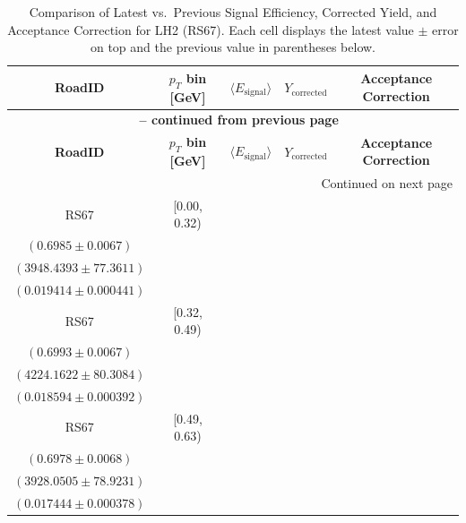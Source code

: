 {\footnotesize
\renewcommand{\arraystretch}{1.35}
\begin{longtable}{|c|c|c|c|c|}
\caption{Comparison of Latest vs.\ Previous Signal Efficiency, Corrected Yield, and Acceptance Correction for LH2 (RS67). Each cell displays the latest value $\pm$ error on top and the previous value in parentheses below.} \label{tab:eff_acc_comp_LH2_RS67} \\
\hline
\textbf{RoadID} & \textbf{$p_{T}$ bin [GeV]} & \textbf{$\langle E_{\mathrm{signal}} \rangle$} & \textbf{$Y_{\mathrm{corrected}}$} & \textbf{Acceptance Correction} \\
\hline
\endfirsthead
\multicolumn{5}{c}{{\bfseries \tablename\ \thetable{} -- continued from previous page}} \\
\hline
\textbf{RoadID} & \textbf{$p_{T}$ bin [GeV]} & \textbf{$\langle E_{\mathrm{signal}} \rangle$} & \textbf{$Y_{\mathrm{corrected}}$} & \textbf{Acceptance Correction} \\
\hline
\endhead
\hline \multicolumn{5}{|r|}{{Continued on next page}} \\ \hline
\endfoot
\hline
\endlastfoot
RS67 & [0.00, 0.32) & \begin{tabular}{@{}c@{}}$0.7529 \pm 0.0042$ \\ $(0.6985 \pm 0.0067)$\end{tabular} & \begin{tabular}{@{}c@{}}$3576.9845 \pm 70.9217$ \\ $(3948.4393 \pm 77.3611)$\end{tabular} & \begin{tabular}{@{}c@{}}$0.018325 \pm 0.000428$ \\ $(0.019414 \pm 0.000441)$\end{tabular} \\ \hline
RS67 & [0.32, 0.49) & \begin{tabular}{@{}c@{}}$0.7541 \pm 0.0043$ \\ $(0.6993 \pm 0.0067)$\end{tabular} & \begin{tabular}{@{}c@{}}$3807.3049 \pm 73.2256$ \\ $(4224.1622 \pm 80.3084)$\end{tabular} & \begin{tabular}{@{}c@{}}$0.017763 \pm 0.000382$ \\ $(0.018594 \pm 0.000392)$\end{tabular} \\ \hline
RS67 & [0.49, 0.63) & \begin{tabular}{@{}c@{}}$0.7504 \pm 0.0043$ \\ $(0.6978 \pm 0.0068)$\end{tabular} & \begin{tabular}{@{}c@{}}$3560.5734 \pm 72.3514$ \\ $(3928.0505 \pm 78.9231)$\end{tabular} & \begin{tabular}{@{}c@{}}$0.016939 \pm 0.000373$ \\ $(0.017444 \pm 0.000378)$\end{tabular} \\ \hline

\end{longtable}}
